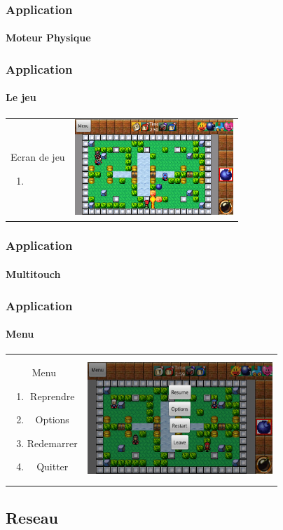 	\begin{frame}
	\frametitle{Application}
	\framesubtitle{Moteur Physique}
	
	\end{frame}
	
		\begin{frame}
	\frametitle{Application}
	\framesubtitle{Le jeu}
	
		\begin{tabular}{cc}
			\begin{minipage}{5cm}
				Ecran de jeu
				\begin{enumerate}
					\item 
				\end{enumerate}
			\end{minipage} &
			\begin{minipage}{7cm}
				\includegraphics[width=6cm]{img/game.png} 
			\end{minipage}\\
		\end{tabular}
	
	\end{frame}
	
	\begin{frame}
	\frametitle{Application}
	\framesubtitle{Multitouch}
	
	\end{frame}
	
	\begin{frame}
	\frametitle{Application}
	\framesubtitle{Menu}
	
			\begin{tabular}{cc}
			\begin{minipage}{4cm}
				Menu
				\begin{enumerate}
					\item Reprendre
					\item Options
					\item Redemarrer
					\item Quitter
				\end{enumerate}
			\end{minipage} &
			\begin{minipage}{7cm}
				\includegraphics[width=7cm]{img/menusolo.png} 
			\end{minipage}\\
		\end{tabular}
	
	\end{frame}


\subsection{Reseau}